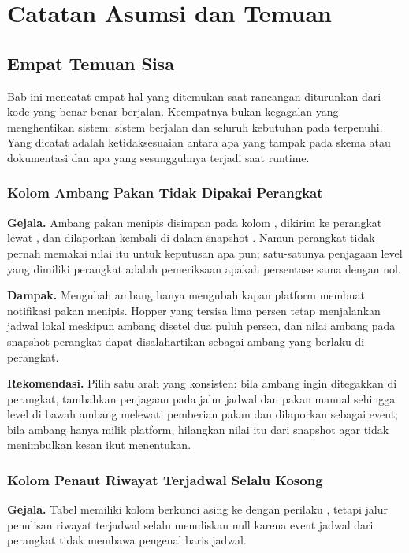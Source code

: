 \chapter{Catatan Asumsi dan Temuan}
\label{ch:09-catatan-asumsi}

\section{Empat Temuan Sisa}

Bab ini mencatat empat hal yang ditemukan saat rancangan diturunkan dari kode yang
benar-benar berjalan. Keempatnya bukan kegagalan yang menghentikan sistem: sistem
berjalan dan seluruh kebutuhan pada  terpenuhi. Yang
dicatat adalah ketidaksesuaian antara apa yang tampak pada skema atau dokumentasi
dan apa yang sesungguhnya terjadi saat runtime.

\subsection{Kolom Ambang Pakan Tidak Dipakai Perangkat}

\textbf{Gejala.} Ambang pakan menipis disimpan pada kolom
, dikirim ke perangkat lewat , dan
dilaporkan kembali di dalam snapshot . Namun perangkat tidak pernah
memakai nilai itu untuk keputusan apa pun; satu-satunya penjagaan level yang dimiliki
perangkat adalah pemeriksaan apakah persentase sama dengan nol.

\textbf{Dampak.} Mengubah ambang hanya mengubah kapan platform membuat notifikasi
pakan menipis. Hopper yang tersisa lima persen tetap menjalankan jadwal lokal
meskipun ambang disetel dua puluh persen, dan nilai ambang pada snapshot perangkat
dapat disalahartikan sebagai ambang yang berlaku di perangkat.

\textbf{Rekomendasi.} Pilih satu arah yang konsisten: bila ambang ingin ditegakkan di
perangkat, tambahkan penjagaan pada jalur jadwal dan pakan manual sehingga level di
bawah ambang melewati pemberian pakan dan dilaporkan sebagai event; bila ambang
hanya milik platform, hilangkan nilai itu dari snapshot agar tidak menimbulkan kesan
ikut menentukan.

\subsection{Kolom Penaut Riwayat Terjadwal Selalu Kosong}

\textbf{Gejala.} Tabel  memiliki kolom 
berkunci asing ke  dengan perilaku , tetapi jalur
penulisan riwayat terjadwal selalu menuliskan null karena event jadwal dari
perangkat tidak membawa pengenal baris jadwal.

